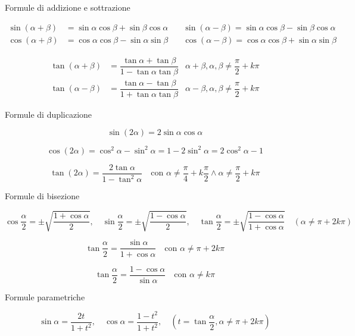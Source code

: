 \begin{mdframed}[linecolor=red,linewidth=0.5pt]
  \vspace{10pt}
  Formule di addizione e sottrazione

  \[
    \begin{aligned}
      \sin(\alpha+\beta) &= \sin \alpha \cos \beta + \sin \beta \cos \alpha \quad & \sin(\alpha-\beta) = \sin \alpha \cos \beta - \sin \beta \cos \alpha \\[6pt]
      \cos(\alpha+\beta) &= \cos \alpha \cos \beta - \sin \alpha \sin \beta \quad & \cos(\alpha-\beta) = \cos \alpha \cos \beta + \sin \alpha \sin \beta
    \end{aligned}
  \]

  \[
    \begin{aligned}
      \tan(\alpha+\beta) &= \dfrac{\tan \alpha + \tan \beta}{1 - \tan \alpha \tan \beta} & \alpha+\beta,\alpha,\beta \neq \dfrac{\pi}{2}+k\pi \\[6pt]
      \tan(\alpha-\beta) &= \dfrac{\tan \alpha - \tan \beta}{1 + \tan \alpha \tan \beta} & \alpha-\beta,\alpha,\beta \neq \dfrac{\pi}{2}+k\pi
    \end{aligned}
  \]

  Formule di duplicazione

  \[
    \sin(2\alpha) = 2 \sin \alpha \cos \alpha
  \]

  \[
    \cos(2\alpha) = \cos^2 \alpha - \sin^2 \alpha = 1 - 2\sin^2 \alpha = 2\cos^2 \alpha - 1
  \]

  \[
    \tan(2\alpha) = \dfrac{2\tan \alpha}{1 - \tan^2 \alpha} \quad \text{con } \alpha \neq \dfrac{\pi}{4} + k \dfrac{\pi}{2} \wedge \alpha \neq \dfrac{\pi}{2}+k\pi
  \]

  Formule di bisezione

  \[
    \cos \dfrac{\alpha}{2} = \pm \sqrt{\dfrac{1+\cos \alpha}{2}}, \quad \sin \dfrac{\alpha}{2} = \pm \sqrt{\dfrac{1-\cos \alpha}{2}}, \quad \tan \dfrac{\alpha}{2} = \pm \sqrt{\dfrac{1-\cos \alpha}{1+\cos \alpha}} \quad (\alpha \neq \pi+2k\pi)
  \]

  \[
    \tan \dfrac{\alpha}{2} = \dfrac{\sin \alpha}{1+\cos \alpha} \quad \text{con } \alpha \neq \pi+2k\pi
  \]

  \[
    \tan \dfrac{\alpha}{2} = \dfrac{1-\cos \alpha}{\sin \alpha} \quad \text{con } \alpha \neq k\pi
  \]

  Formule parametriche

  \[
    \sin \alpha = \dfrac{2t}{1+t^2}, \quad \cos \alpha = \dfrac{1-t^2}{1+t^2}, \quad \left(t = \tan \dfrac{\alpha}{2}, \alpha \neq \pi+2k\pi\right)
  \]
  \vspace{20pt}
  \endgroup
\end{mdframed}
